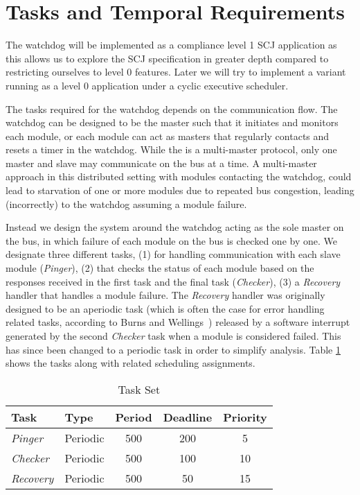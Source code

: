 \section{Tasks and Temporal Requirements}
The watchdog will be implemented as a compliance level 1 SCJ application as this allows us to explore the SCJ specification in greater depth compared to restricting ourselves to level 0 features. Later we will try to implement a variant running as a level 0 application under a cyclic executive scheduler.

The tasks required for the watchdog depends on the communication flow. The watchdog can be designed to be the master such that it initiates and monitors each module, or each module can act as masters that regularly contacts and resets a timer in the watchdog. While the \iic is a multi-master protocol, only one master and slave may communicate on the bus at a time.
A multi-master approach in this distributed setting with modules contacting the watchdog, could lead to starvation of one or more modules due to repeated bus congestion, leading (incorrectly) to the watchdog assuming a module failure.

Instead we design the system around the watchdog acting as the sole master on the bus, in which failure of each module on the bus is checked one by one. We designate three different tasks, (1) for handling \iic communication with each slave module (\textit{Pinger}), (2) that checks the status of each module based on the responses received in the first task and the final task (\textit{Checker}), (3) a \textit{Recovery} handler that handles a module failure. The \textit{Recovery} handler was originally designed to be an aperiodic task (which is often the case for error handling related tasks, according to Burns and Wellings~\cite{alan2001real}) released by a software interrupt generated by the second \textit{Checker} task when a module is considered failed. This has since been changed to a periodic task in order to simplify analysis. Table \ref{tab:taskslol} shows the tasks along with related scheduling assignments.
\begin{table}
\centering
\begin{tabular}{ | l | l | c | c | c |}
\hline
Task & Type & Period & Deadline & Priority  \\ \hline
\textit{Pinger} & Periodic & 500 & 200 & 5  \\ \hline
\textit{Checker} & Periodic & 500 & 100 & 10 \\ \hline
\textit{Recovery} & Periodic & 500 & 50 &  15 \\
\hline
\end{tabular}
 \caption{Task Set}
 \label{tab:taskslol}
\end{table}

